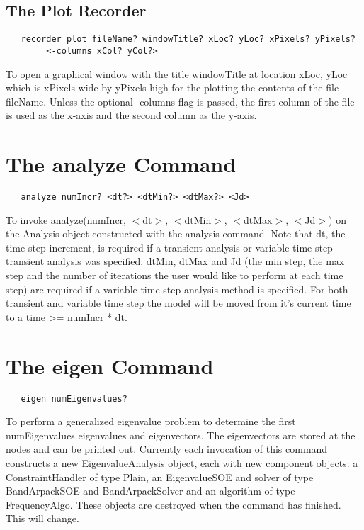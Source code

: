 \documentclass[12pt]{article}
\begin{document}
\subsection{The Plot Recorder}

{\sf\small
\begin{verbatim}
   recorder plot fileName? windowTitle? xLoc? yLoc? xPixels? yPixels? 
        <-columns xCol? yCol?>
\end{verbatim}
}

\noindent To open a graphical window with the title windowTitle at location
xLoc, yLoc which is xPixels wide by yPixels high for the plotting the
contents of the file fileName. Unless the optional -columns flag is
passed, the first column of the file is used as the x-axis and the
second column as the y-axis. 

\section {The analyze Command}
{\sf\small
\begin{verbatim}
   analyze numIncr? <dt?> <dtMin?> <dtMax?> <Jd>
\end{verbatim}
}

\noindent To invoke analyze(numIncr, $<$dt$>$, $<$dtMin$>$,
$<$dtMax$>$, $<$Jd$>$) on the Analysis object constructed with the
analysis command. Note that dt, the time step increment, is required
if a transient analysis or variable time step transient analysis was
specified. dtMin, dtMax and Jd (the min step, the max step and the
number of iterations the user would like to perform at each time step)
are required if a variable time step analysis method is specified.
For both transient and variable time step the model will be moved from
it's current time to a time >= numIncr * dt.



\section {The eigen Command}
{\sf\small
\begin{verbatim}
   eigen numEigenvalues?
\end{verbatim}
}

\noindent To perform a generalized eigenvalue problem to determine the
first numEigenvalues eigenvalues and eigenvectors. The eigenvectors
are stored at the nodes and can be printed out. Currently each
invocation of this command constructs a new EigenvalueAnalysis object,
each with new component objects: a ConstraintHandler of type Plain, an
EigenvalueSOE and solver of type BandArpackSOE and BandArpackSolver
and an algorithm of type FrequencyAlgo. These objects are destroyed
when the command has finished. This will change.
\end{document}
